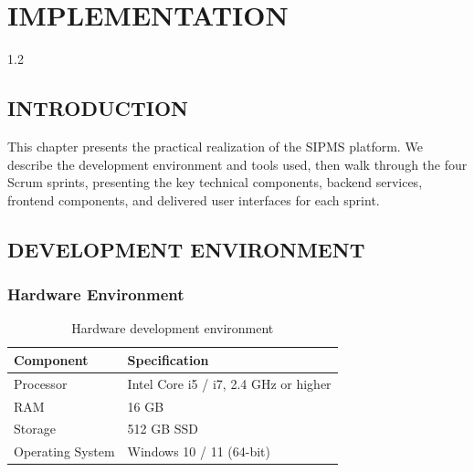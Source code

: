 \chapter{IMPLEMENTATION}
\begin{spacing}{1.2}
\minitoc
\thispagestyle{MyStyle}
\end{spacing}
\newpage

\section{INTRODUCTION}
This chapter presents the practical realization of the SIPMS platform. We describe the development environment and tools used, then walk through the four Scrum sprints, presenting the key technical components, backend services, frontend components, and delivered user interfaces for each sprint.

\section{DEVELOPMENT ENVIRONMENT}

\subsection{Hardware Environment}
\begin{table}[H]
\centering
\begin{tabular}{|p{4cm}|p{9cm}|}
\hline
\rowcolor{gray!20}
\textbf{Component} & \textbf{Specification} \\
\hline
Processor & Intel Core i5 / i7, 2.4 GHz or higher \\
\hline
RAM & 16 GB \\
\hline
Storage & 512 GB SSD \\
\hline
Operating System & Windows 10 / 11 (64-bit) \\
\hline
\end{tabular}
\caption{Hardware development environment}
\end{table}

